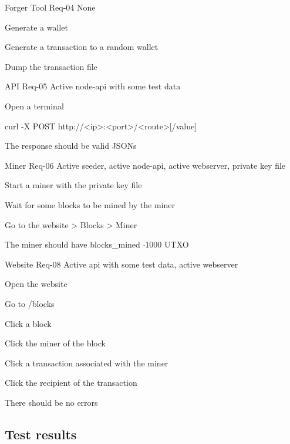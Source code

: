 \documentclass[../documentation.tex]{subfiles}
\begin{document}
    {Forger Tool}
    {Req-04}
    {None}
    {
        \item Generate a wallet
        \item Generate a transaction to a random wallet
        \item Dump the transaction file
    }

    {API}
    {Req-05}
    {Active node-api with some test data}
    {
        \item Open a terminal
        \item curl -X POST http://<ip>:<port>/<route>[/value]
        \item The response should be valid JSONs
    }

    {Miner}
    {Req-06}
    {Active seeder, active node-api, active webserver, private key file}
    {
        \item Start a miner with the private key file
        \item Wait for some blocks to be mined by the miner
        \item Go to the website > Blocks > Miner
        \item The miner should have blocks\_mined \(\cdot 1000\) UTXO
    }

    {Website}
    {Req-08}
    {Active api with some test data, active webserver}
    {
        \item Open the website
        \item Go to /blocks
        \item Click a block
        \item Click the miner of the block
        \item Click a transaction associated with the miner
        \item Click the recipient of the transaction
        \item There should be no errors
    }

\pagebreak

\subsection{Test results}
\end{document}
